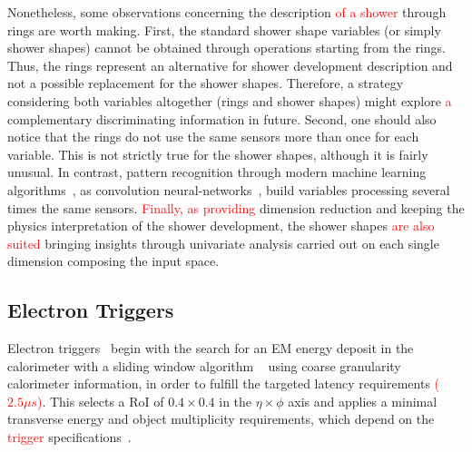 Nonetheless, some observations concerning the description \textcolor{red}{of a shower} through rings are
worth making. First, the standard shower shape variables (or simply shower shapes) cannot be obtained through operations starting from the rings.  Thus, the rings represent an alternative for shower development description and not a possible replacement for the shower shapes.  Therefore, a strategy considering both variables altogether (rings and shower shapes) might explore \textcolor{red}{a} complementary discriminating information in future.
Second, one should also notice
that the rings do not use the same sensors more than once for each variable.
This is not strictly true for the shower shapes, although it is fairly unusual.
In contrast, pattern recognition through modern machine learning
algorithms~\cite{Engelbrecht2007,Goodfellow2016}, as convolution
neural-networks~\cite{Gu2018}, build variables processing several times
the same sensors. \textcolor{red}{Finally, as providing} dimension reduction and keeping the
physics interpretation of the shower development, the shower shapes \textcolor{red}{are also suited} bringing insights through univariate analysis carried out on each
single dimension composing the input space.



\subsection{Electron Triggers}\label{ssec:egamma_trigger}


Electron triggers~\cite{aad2020performance} begin with
the search for an EM energy deposit in the calorimeter with a \licalo{} sliding
window algorithm \textcolor{red}{~\cite{Franchino:2730851}} using coarse granularity calorimeter information, in order to
fulfill the targeted latency requirements \textcolor{red}{($2.5\mu s$)}. This selects a RoI of $0.4\times 0.4$
in the $\eta\times\phi$ axis and applies a minimal transverse energy and object
multiplicity requirements, which depend on the \textcolor{red}{trigger}
specifications~\cite{TRIG-2016-01}.
 
